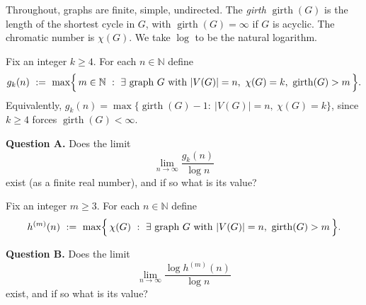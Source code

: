 Throughout, graphs are finite, simple, undirected.  The \emph{girth} $\operatorname{girth}(G)$ is the length of the shortest cycle in $G$, with $\operatorname{girth}(G)=\infty$ if $G$ is acyclic.  The chromatic number is $\chi(G)$.
We take $\log$ to be the natural logarithm.

Fix an integer $k\ge 4$.  For each $n\in\mathbb{N}$ define
\[
g_k(n)\ :=\ \max\Bigl\{\, m\in\mathbb{N}\ :\ \exists\text{ graph }G\text{ with }|V(G)|=n,\ \chi(G)=k,\ \operatorname{girth}(G)>m\,\Bigr\}.
\]
Equivalently, $g_k(n)=\max\{\operatorname{girth}(G)-1:\ |V(G)|=n,\ \chi(G)=k\}$, since $k\ge4$ forces $\operatorname{girth}(G)<\infty$.

\medskip
\noindent\textbf{Question A.} Does the limit
\[
\lim_{n\to\infty}\frac{g_k(n)}{\log n}
\]
exist (as a finite real number), and if so what is its value?

\medskip
Fix an integer $m\ge 3$.  For each $n\in\mathbb{N}$ define
\[
h^{(m)}(n)\ :=\ \max\Bigl\{\,\chi(G)\ :\ \exists\text{ graph }G\text{ with }|V(G)|=n,\ \operatorname{girth}(G)>m\,\Bigr\}.
\]

\medskip
\noindent\textbf{Question B.} Does the limit
\[
\lim_{n\to\infty}\frac{\log h^{(m)}(n)}{\log n}
\]
exist, and if so what is its value?
